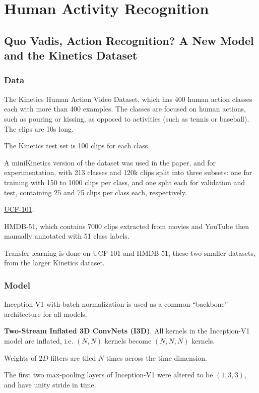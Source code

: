 \documentclass[a4paper, 12pt]{article}
\begin{document}
\section{Human Activity Recognition}

\subsection{Quo Vadis, Action Recognition? A New Model and the Kinetics
            Dataset\cite{carreira2017quo}}

\subsubsection{Data}

The Kinetics Human Action Video Dataset\cite{kay2017kinetics}, which has 400
human action classes each with more than 400 examples. The classes are focused
on human actions, such as pouring or kissing, as opposed to activities (such as
tennis or baseball). The clips are 10s long.

The Kinetics test set is 100 clips for each class.

A miniKinetics version of the dataset was used in the paper, and for
experimentation, with 213 classes and 120k clips split into three subsets: one
for training with 150 to 1000 clips per class, and one split each for
validation and test, containing 25 and 75 clips per class each, respectively.

\hyperref[ucf101]{UCF-101}.

HMDB-51\cite{Kuehne11}, which contains 7000 clips extracted from movies and
YouTube then manually annotated with 51 class labels.

Transfer learning is done on UCF-101 and HMDB-51, these two smaller datasets,
from the larger Kinetics dataset.

\subsubsection{Model}

Inception-V1 with batch normalization is used as a common ``backbone''
architecture for all models.

\textbf{Two-Stream Inflated 3D ConvNets (I3D)}. All kernels in the Inception-V1
model are inflated, i.e. $(N, N)$ kernels become $(N, N, N)$ kernels.

Weights of $2D$ filters are tiled $N$ times across the time dimension.

The first two max-pooling layers of Inception-V1 were altered to be
$(1, 3, 3)$, and have unity stride in time.
\end{document}

